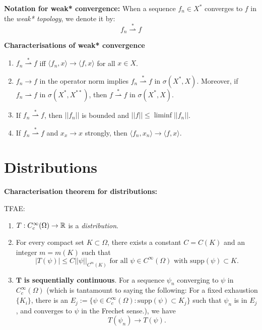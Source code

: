 \textbf{Notation for weak* convergence:} When a sequence $f_n\in X^*$ converges to $f$ in the \emph{weak* topology}, we denote it by: $$f_n \overset{\ast}{\rightharpoonup} f $$

\begin{theorem}
    \textbf{Characterisations of weak* convergence\cite{Brezis2011}}
    \begin{enumerate}
        \item $f_n\overset{\ast}{\rightharpoonup} f$ iff $\langle f_n,x\rangle\to \langle f,x\rangle$ for all $x\in X$. 
        \item $f_n\to f$ in the operator norm implies $f_n \overset{\ast}{\rightharpoonup} f$ in $\sigma(X^*,X)$. Moreover, if $f_n \rightharpoonup f$ in $\sigma(X^*,X^{**})$, then $f\overset{\ast}{\rightharpoonup} f$ in $\sigma(X^*,X)$.
        \item If $f_n \overset{\ast}{\rightharpoonup} f$, then $||f_n||$ is bounded and $||f||\leq \liminf ||f_n||$.
        \item If $f_n\overset{\ast}{\rightharpoonup}f$ and $x_x\to x$ strongly, then $\langle f_n,x_n\rangle \to \langle f,x\rangle$.
    \end{enumerate}
\end{theorem}

\section{Distributions}
\begin{theorem}\label{thm:characterise_distributions}
    \textbf{Characterisation theorem for distributions:}

    TFAE:
    \begin{enumerate}
        \item $T:C^{\infty}_c(\Omega)\to \mathbb{R}$ is a \emph{distribution}.
        \item For every compact set $K\subset \Omega$, there exists a constant $C=C(K)$ and an integer $m=m(K)$ such that $$|T(\psi)|\leq C||\psi||_{C^m(K)} \text{ for all }\psi \in C^{\infty}(\Omega)\text{ with }\mathrm{supp}(\psi) \subset K.$$
        \item $\mathbf{T}$ \textbf{is sequentially continuous}. For a sequence $\psi_n$ converging to $\psi$ in $C^{\infty}_c(\Omega)$ (which is tantamount to saying the following: For a fixed exhaustion $\{K_i\}$, there is an $E_j:=\{\psi\in C^{\infty}_c(\Omega): \mathrm{supp}(\psi) \subset K_j \}$ such that $\psi_n$ is in $E_j$, and converges to $\psi$ in the Frechet sense.), we have $$T(\psi_n)\to T(\psi).$$
    \end{enumerate}

\end{theorem}

